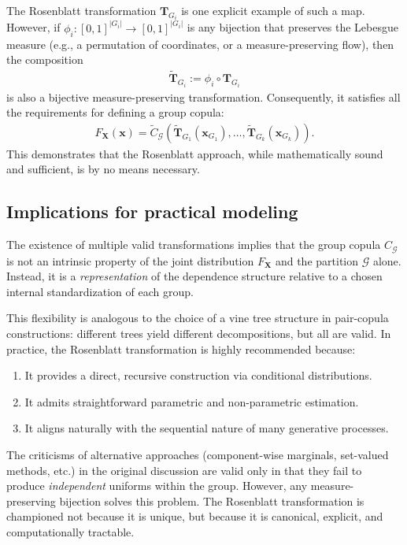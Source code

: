 The Rosenblatt transformation $\mathbf{T}_{G_i}$ is one explicit example of such a map. However, if $\phi_i: [0,1]^{|G_i|} \to [0,1]^{|G_i|}$ is any bijection that preserves the Lebesgue measure (e.g., a permutation of coordinates, or a measure-preserving flow), then the composition
\begin{align}
\tilde{\mathbf{T}}_{G_i} := \phi_i \circ \mathbf{T}_{G_i}
\end{align}
is also a bijective measure-preserving transformation. Consequently, it satisfies all the requirements for defining a group copula:
\begin{align}
F_{\mathbf{X}}(\mathbf{x}) = \tilde{C}_{\mathcal{G}}(\tilde{\mathbf{T}}_{G_1}(\mathbf{x}_{G_1}), \ldots, \tilde{\mathbf{T}}_{G_k}(\mathbf{x}_{G_k})).
\end{align}
This demonstrates that the Rosenblatt approach, while mathematically sound and sufficient, is by no means necessary.

\subsection{Implications for practical modeling}
The existence of multiple valid transformations implies that the group copula $C_{\mathcal{G}}$ is not an intrinsic property of the joint distribution $F_{\mathbf{X}}$ and the partition $\mathcal{G}$ alone. Instead, it is a \emph{representation} of the dependence structure relative to a chosen internal standardization of each group.

This flexibility is analogous to the choice of a vine tree structure in pair-copula constructions: different trees yield different decompositions, but all are valid. In practice, the Rosenblatt transformation is highly recommended because:
\begin{enumerate}
    \item It provides a direct, recursive construction via conditional distributions.
    \item It admits straightforward parametric and non-parametric estimation.
    \item It aligns naturally with the sequential nature of many generative processes.
\end{enumerate}

\begin{remarkbox}
\begin{remarkT}
The criticisms of alternative approaches (component-wise marginals, set-valued methods, etc.) in the original discussion are valid only in that they fail to produce \emph{independent} uniforms within the group. However, any measure-preserving bijection solves this problem. The Rosenblatt transformation is championed not because it is unique, but because it is canonical, explicit, and computationally tractable.
\end{remarkT}
\end{remarkbox}

